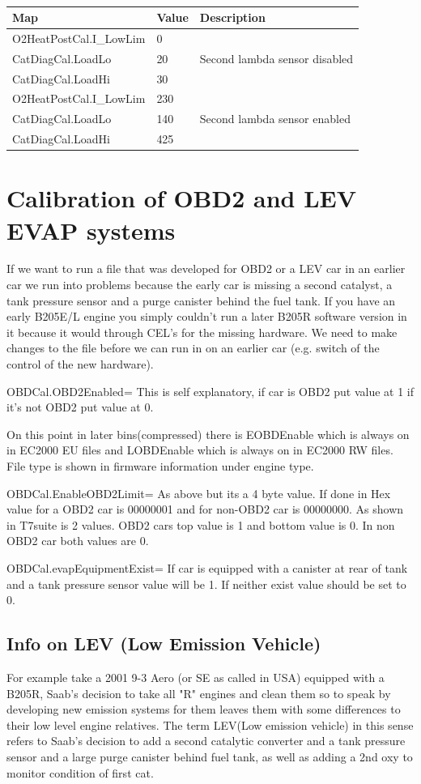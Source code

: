 \documentclass[11pt,a4paper]{book}
\begin{document}
\begin{table}
    \centering
    \begin{tabular}{lll}
Map & Value & Description \\
\midrule
O2HeatPostCal.I\_LowLim& 0& \multirow{3}{*}{Second lambda sensor disabled} \\
CatDiagCal.LoadLo &20 &\\
CatDiagCal.LoadHi &30&\\
O2HeatPostCal.I\_LowLim & 230 & \multirow{3}{*}{Second lambda sensor enabled}\\
CatDiagCal.LoadLo &140 &\\
CatDiagCal.LoadHi &425 &\\
    \end{tabular}
    \caption{}
    \label{tab:}
\end{table}

\section{Calibration of OBD2 and LEV EVAP systems}
If we want to run a file that was developed for OBD2 or a LEV car in an earlier car we run into
problems because the early car is missing a second catalyst, a tank pressure sensor and a purge
canister behind the fuel tank. If you have an early B205E/L engine you simply couldn’t run a later
B205R software version in it because it would through CEL’s for the missing hardware. We need to
make changes to the file before we can run in on an earlier car (e.g. switch of the control of the new
hardware).

OBDCal.OBD2Enabled= This is self explanatory, if car is OBD2 put value at 1 if it's not OBD2 put value
at 0.

On this point in later bins(compressed) there is EOBDEnable which is always on in EC2000 EU files
and LOBDEnable which is always on in EC2000 RW files. File type is shown in firmware information
under engine type.

OBDCal.EnableOBD2Limit= As above but its a 4 byte value. If done in Hex value for a OBD2 car is
00000001 and for non-OBD2 car is 00000000. As shown in T7suite is 2 values. OBD2 cars top value is
1 and bottom value is 0. In non OBD2 car both values are 0.

OBDCal.evapEquipmentExist= If car is equipped with a canister at rear of tank and a tank pressure
sensor value will be 1. If neither exist value should be set to 0.
\subsection{Info on LEV (Low Emission Vehicle)}
For example take a 2001 9-3 Aero (or SE as called in USA) equipped with a B205R, Saab's decision to
take all "R" engines and clean them so to speak by developing new emission systems for them leaves
them with some differences to their low level engine relatives. The term LEV(Low emission vehicle) in
this sense refers to Saab's decision to add a second catalytic converter and a tank pressure sensor
and a large purge canister behind fuel tank, as well as adding a 2nd oxy to monitor condition of first
cat.
\end{document}
